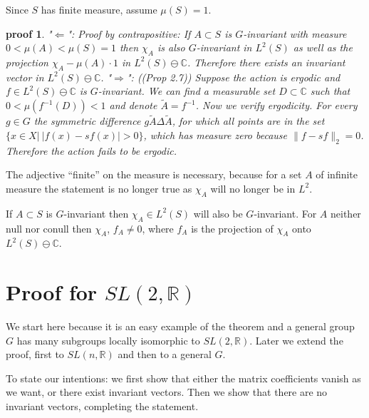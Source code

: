 \documentclass[
]{article}
\theoremstyle{break}
\theoremstyle{plain}
\newtheorem*{pf}{proof}
\begin{document}
Since $S$ has finite measure, assume $\mu(S) =1$.

\begin{pf}
"$\Leftarrow$": Proof by contrapositive: If $A\subset S$ is $G$-invariant with
measure $0 < \mu(A) < \mu(S) = 1$ then $\chi_A$ is also $G$-invariant in
$L^2(S)$ as well as the projection $\chi_A - \mu(A)\cdot 1$ in $L^2(S)\ominus
\mathbb{C}$. Therefore there exists an invariant vector in $L^2(S)\ominus
\mathbb{C}$. "$\Rightarrow$": (\cite{Kerr16}(Prop 2.7)) Suppose the action is
ergodic and $f\in L^2(S)\ominus \mathbb{C}$ is $G$-invariant. We can find a
measurable set $D\subset \mathbb{C}$ such that $0<\mu(f^{-1}(D)) < 1$ and
denote $\widetilde{A} = f^{-1}$. Now we verify ergodicity. For every $g\in G$
the symmetric difference $g\widetilde{A} \Delta \widetilde{A}$, for which all
points are in the set $\{x \in X | \ |f(x)-sf(x)| > 0\}$, which has measure
zero because $\|f- sf\|_2=0$. Therefore the action fails to be ergodic.
\end{pf}

The adjective ``finite'' on the measure is necessary, because for a set
$A$ of infinite measure the statement is no longer true as $\chi_A$
will no longer be in $L^2$.

If $A\subset S$ is $G$-invariant then $\chi_A\in L^2(S)$ will also
be $G$-invariant. 
For $A$ neither null nor conull then
$\chi_A$, $f_A \neq 0$, where $f_A$ is the projection of
$\chi_A$ onto $L^2(S) \ominus \mathbb{C}$.








\hypertarget{proof-for-sln2r}{%
\section{Proof for \texorpdfstring{$SL(2, \mathbb{R})$}{SL(2, R)}}\label{proof-for-sln2r}}


We start here because it is an easy example of the theorem and a general
group $G$ has many subgroups locally isomorphic to
$SL(2, \mathbb{R})$. Later we extend the proof, first to
$SL(n, \mathbb{R})$ and then to a general $G$.

To state our intentions: we first show that either the matrix
coefficients vanish as we want, or there exist invariant vectors. Then
we show that there are no invariant vectors, completing the statement.
\end{document}
